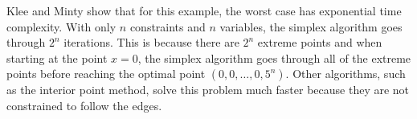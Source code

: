Klee and Minty show that for this example, the worst case has exponential time complexity.
With only $n$ constraints and $n$ variables, the simplex algorithm goes through $2^n$ iterations.
This is because there are $2^n$ extreme points and when starting at the point $x=0$, the simplex algorithm goes through all of the extreme points before reaching the optimal point $(0,0,\dots, 0, 5^n)$.
Other algorithms, such as the interior point method, solve this problem much faster because they are not constrained to follow the edges. 


% 
